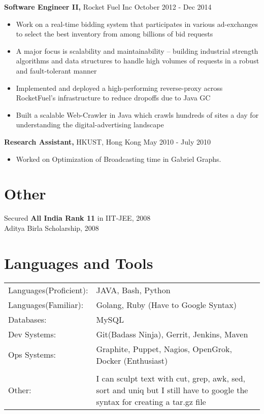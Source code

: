 \documentclass[margin]{res}
\begin{document}
\begin{resume}
 {\bf Software Engineer II,} Rocket Fuel Inc \hfill October 2012 - Dec 2014
 \begin{itemize} \itemsep -2pt  %
 \item Work on a real-time bidding system that participates in various ad-exchanges to select the best inventory from among billions of bid requests
 \item A major focus is scalability and maintainability -- building industrial strength algorithms and data structures to handle high volumes of requests in a robust and fault-tolerant manner
 \item Implemented and deployed a high-performing reverse-proxy across RocketFuel's infrastructure to reduce dropoffs due to Java GC
 \item Built a scalable Web-Crawler in Java which crawls hundreds of sites a day for understanding the digital-advertising landscape
 \end{itemize}

 {\bf Research Assistant,} HKUST, Hong Kong \hfill May  2010  - July  2010
 \begin{itemize} \itemsep -2pt  %
 \item Worked  on  Optimization  of  Broadcasting  time  in  Gabriel  Graphs.
 \end{itemize}





\section{Other}
 Secured {\bf All India Rank 11} in IIT-JEE, 2008 \\
Aditya Birla Scholarship, 2008 \\



\section{Languages and Tools}
   \begin{tabular}{l p{3in}}
    {Languages(Proficient):} & JAVA, Bash, Python \\
    {Languages(Familiar):} &  Golang, Ruby (Have to Google Syntax) \\
    {Databases:} &  MySQL \\
    {Dev Systems:} &  Git(Badass Ninja), Gerrit, Jenkins, Maven \\
    {Ops Systems:} &  Graphite, Puppet, Nagios, OpenGrok, Docker (Enthusiast) \\

    {} &   \\
    {Other:} & I can sculpt text with cut, grep, awk, sed, sort and uniq but I still have to google the syntax for creating a tar.gz file \\

 \end{tabular}


\bigskip
\bigskip


\end{resume}
\end{document}
